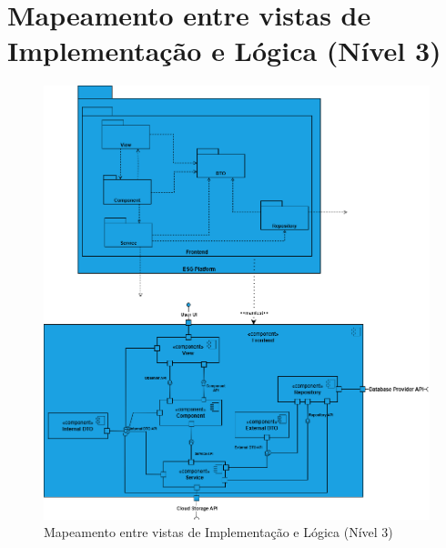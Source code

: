\chapter{Mapeamento entre vistas de Implementação e Lógica (Nível 3)}
\label{AppendixB}

\begin{figure}[h]
    \centering
    \includegraphics[width=5in]{frontmatter/assets/diagrams/Mapeamento.drawio.png}
    \caption{Mapeamento entre vistas de Implementação e Lógica (Nível 3)}
    \label{fig:mapeamento}
\end{figure}